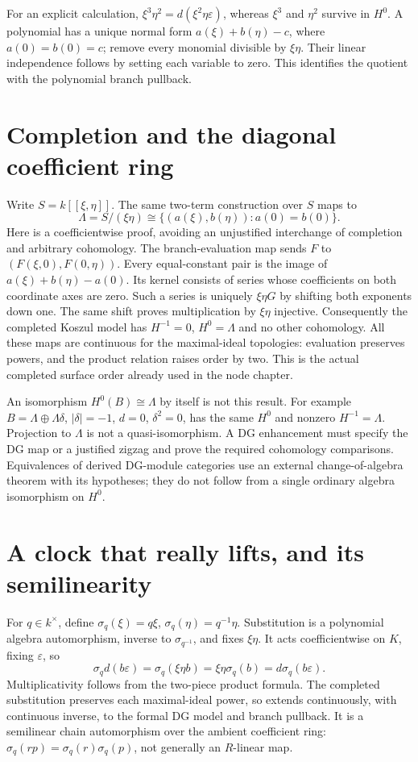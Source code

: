 \documentclass[11pt,oneside,openany]{book}
\theoremstyle{definition}\newtheorem{definition}[theorem]{Definition}
\theoremstyle{remark}\newtheorem{remark}[theorem]{Remark}
\begin{document}
For an explicit calculation,
$\xi^3\eta^2=d(\xi^2\eta\varepsilon)$, whereas $\xi^3$ and $\eta^2$
survive in $H^0$. A polynomial has a unique normal form
$a(\xi)+b(\eta)-c$, where $a(0)=b(0)=c$; remove every monomial divisible
by $\xi\eta$. Their linear independence follows by setting each variable
to zero. This identifies the quotient with the polynomial branch pullback.

\section{Completion and the diagonal coefficient ring}
Write $S=k[[\xi,\eta]]$. The same two-term construction over $S$ maps to
\[
 \Lambda=S/(\xi\eta)\cong
 \{(a(\xi),b(\eta)):a(0)=b(0)\}.
\]
Here is a coefficientwise proof, avoiding an unjustified interchange of
completion and arbitrary cohomology. The branch-evaluation map sends
$F$ to $(F(\xi,0),F(0,\eta))$. Every equal-constant pair is the image of
$a(\xi)+b(\eta)-a(0)$. Its kernel consists of series whose coefficients
on both coordinate axes are zero. Such a series is uniquely $\xi\eta G$
by shifting both exponents down one. The same shift proves multiplication
by $\xi\eta$ injective. Consequently the completed Koszul model has
$H^{-1}=0$, $H^0=\Lambda$ and no other cohomology. All these maps are
continuous for the maximal-ideal topologies: evaluation preserves powers,
and the product relation raises order by two. This is the actual completed
surface order already used in the node chapter.

An isomorphism $H^0(B)\cong\Lambda$ by itself is not this result.
For example $B=\Lambda\oplus\Lambda\delta$, $|\delta|=-1$, $d=0$,
$\delta^2=0$, has the same $H^0$ and nonzero $H^{-1}=\Lambda$.
Projection to $\Lambda$ is not a quasi-isomorphism. A DG enhancement must
specify the DG map or a justified zigzag and prove the required cohomology
comparisons. Equivalences of derived DG-module categories use an external
change-of-algebra theorem with its hypotheses; they do not follow from a
single ordinary algebra isomorphism on $H^0$.

\section{A clock that really lifts, and its semilinearity}
For $q\in k^\times$, define $\sigma_q(\xi)=q\xi$,
$\sigma_q(\eta)=q^{-1}\eta$. Substitution is a polynomial algebra
automorphism, inverse to $\sigma_{q^{-1}}$, and fixes $\xi\eta$.
It acts coefficientwise on $K$, fixing $\varepsilon$, so
\[
 \sigma_q d(b\varepsilon)=\sigma_q(\xi\eta b)
 =\xi\eta\sigma_q(b)=d\sigma_q(b\varepsilon).
\]
Multiplicativity follows from the two-piece product formula. The completed
substitution preserves each maximal-ideal power, so extends continuously,
with continuous inverse, to the formal DG model and branch pullback.
It is a semilinear chain automorphism over the ambient coefficient ring:
$\sigma_q(rp)=\sigma_q(r)\sigma_q(p)$, not generally an $R$-linear map.
\end{document}
